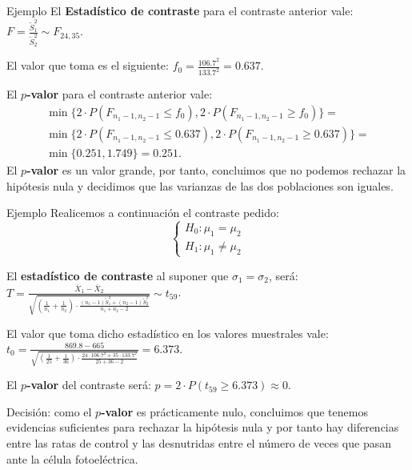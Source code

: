 \documentclass[
  ignorenonframetext,
]{beamer}
\begin{document}
\begin{frame}{Ejemplo}
\protect\hypertarget{ejemplo-25}{}
El \textbf{Estadístico de contraste} para el contraste anterior vale:
\(F=\frac{\widetilde{S}_1^2}{\widetilde{S}_2^2}\sim F_{24,35}.\)

El valor que toma es el siguiente:
\(f_0=\frac{106.7^2}{133.7^2}=0.637.\)

El \textbf{\(p\)-valor} para el contraste anterior vale: \[
\begin{array}{l}
\min\{2\cdot P(F_{n_1-1,n_2-1}\leq f_0),2\cdot P(F_{n_1-1,n_2-1}\geq f_0)\}= \\
\min\{2\cdot P(F_{n_1-1,n_2-1}\leq 0.637),2\cdot P(F_{n_1-1,n_2-1}\geq 0.637)\} 
= \\ \min\{0.251,1.749\}=0.251.
\end{array}
\] El \textbf{\(p\)-valor} es un valor grande, por tanto, concluimos que
no podemos rechazar la hipótesis nula y decidimos que las varianzas de
las dos poblaciones son iguales.
\end{frame}

\begin{frame}{Ejemplo}
\protect\hypertarget{ejemplo-26}{}
Realicemos a continuación el contraste pedido: \[
\left\{\begin{array}{l}
H_0:\mu_1=\mu_2\\
H_1:\mu_1\neq \mu_2
\end{array}\right.
\]

El \textbf{estadístico de contraste} al suponer que
\(\sigma_1= \sigma_2\), será:
\(T=\frac{\overline{X}_1-\overline{X}_2} {\sqrt{(\frac1{n_1}+\frac1{n_2})\cdot \frac{(n_1-1)\widetilde{S}_1^2+(n_2-1)\widetilde{S}_2^2} {n_1+n_2-2}}}\sim t_{59}\).

El valor que toma dicho estadístico en los valores muestrales vale:
\(t_0=\frac{869.8-665}{\sqrt{(\frac1{25}+\frac1{36})\cdot \frac{24\cdot 106.7^2+35\cdot 133.7^2} {25+36-2}}}=6.373.\)

El \textbf{\(p\)-valor} del contraste será:
\(p=2\cdot P(t_{59}\geq 6.373)\approx 0.\)

Decisión: como el \textbf{\(p\)-valor} es prácticamente nulo, concluimos
que tenemos evidencias suficientes para rechazar la hipótesis nula y por
tanto hay diferencias entre las ratas de control y las desnutridas entre
el número de veces que pasan ante la célula fotoeléctrica.
\end{frame}
\end{document}
